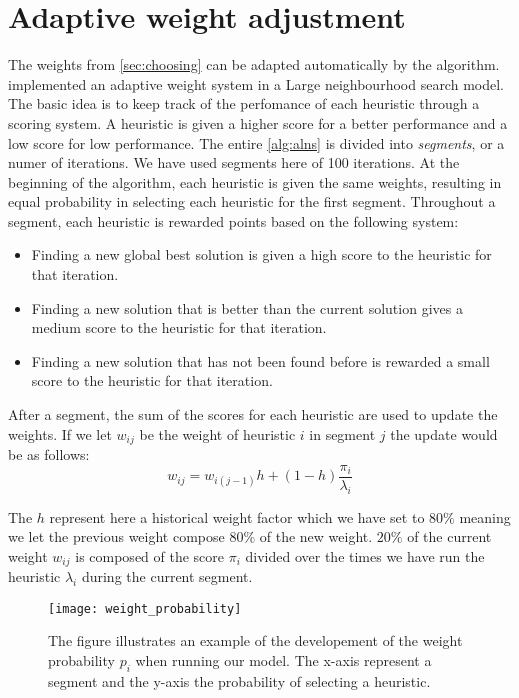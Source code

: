 \documentclass[../main.tex]{subfiles}
\begin{document}
\section{Adaptive weight adjustment}
\label{sec:weight}
The weights from \cref{sec:choosing} can be adapted automatically by the algorithm. \cite{ropke06} implemented an adaptive weight system in a Large neighbourhood search model.
The basic idea is to keep track of the perfomance of each heuristic through a scoring system. 
A heuristic is given a higher score for a better performance and a low score for low performance. 
The entire \cref{alg:alns} is divided into \textit{segments}, or a numer of iterations. 
We have used segments here of 100 iterations.
At the beginning of the algorithm, each heuristic is given the same weights, resulting in equal probability in selecting each heuristic for the first segment.
Throughout a segment, each heuristic is rewarded points based on the following system:
\begin{itemize}
    \item Finding a new global best solution is given a high score to the heuristic for that iteration.
    \item Finding a new solution that is better than the current solution gives a medium score to the heuristic for that iteration.
    \item Finding a new solution that has not been found before is rewarded a small score to the heuristic for that iteration.
\end{itemize}
After a segment, the sum of the scores for each heuristic are used to update the weights. If we let $w_{ij}$ be the weight of heuristic $i$ in segment $j$ the update would be as follows:
\begin{equation}\label{eq:update}
    w_{ij} = w_{i(j-1)}h + (1-h)\dfrac{\pi_i}{\lambda_i}
\end{equation}

The $h$ represent here a historical weight factor which we have set to $80\%$ meaning we let the previous weight compose $80\%$ of the new weight. 
$20\%$ of the current weight $w_{ij}$ is composed of the score $\pi_i$ divided over the times we have run the heuristic $\lambda_i$ during the current segment.

\begin{figure}                                                                    
    \centering                                                                                     
    \texttt{[image: weight\_probability]}                                     
    \caption{The figure illustrates an example of the developement of the weight probability $p_i$ when running our model. The x-axis represent a segment and the y-axis the probability of selecting a heuristic.}
    \label{fig:weights}
\end{figure}
\end{document}
